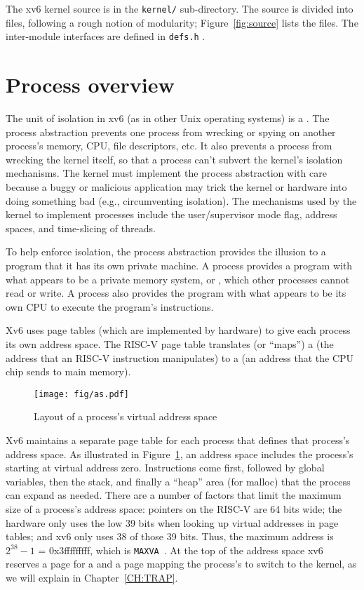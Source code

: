 The xv6 kernel source is in the {\tt kernel/} sub-directory. The
source is divided into files, following a rough notion of modularity;
Figure~\ref{fig:source} lists the files.  The inter-module interfaces
are defined in \lstinline{defs.h} .

\section{Process overview}

The unit of isolation in xv6 (as in other Unix operating systems) is a 
.
The process abstraction prevents one process from wrecking or spying on
another process's memory, CPU, file descriptors, etc.  It also prevents a process
from wrecking the kernel itself, so that a process can't subvert the kernel's
isolation mechanisms.
The kernel must implement the process abstraction with care because
a buggy or malicious application may trick the kernel or hardware into doing
something bad (e.g., circumventing isolation).  The mechanisms used by
the kernel to implement processes include the user/supervisor mode flag, address spaces,
and time-slicing of threads.

To help enforce isolation, the process abstraction provides the
illusion to a program that it has its own private machine.  A process provides
a program with what appears to be a private memory system, or
, 
which other processes cannot read or write.
A process also provides the program with what appears to be its own
CPU to execute the program's instructions.

Xv6 uses page tables (which are implemented by hardware) to give each process
its own address space. The RISC-V page table
translates (or ``maps'') a
(the address that an RISC-V instruction manipulates) to a
(an address that the CPU chip sends to main memory).

\begin{figure}[t]
\centering
\texttt{[image: fig/as.pdf]}
\caption{Layout of a process's virtual address space}
\label{fig:as}
\end{figure}

Xv6 maintains a separate page table for each process that defines that process's
address space. As illustrated in 
Figure~\ref{fig:as},
an address space includes the process's
starting at virtual address zero. Instructions come first,
followed by global variables, then the stack,
and finally a ``heap'' area (for malloc)
that the process can expand as needed.
There are a number of factors that limit the
maximum size of a process's address space:
pointers on the RISC-V are 64 bits wide;
the hardware only uses the low 39 bits when
looking up virtual addresses in page tables;
and xv6 only uses 38 of those 39 bits.
Thus, the maximum address is $2^{38}-1$ =
0x3fffffffff, which is \lstinline{MAXVA}~.
At the top of the address space xv6 reserves a page
for a  and a page mapping
the process's 
to switch to the kernel, as we will explain in Chapter~\ref{CH:TRAP}.

